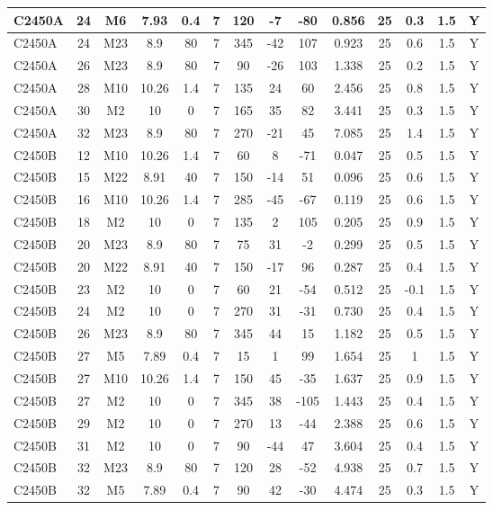 \documentclass{article}
\begin{document}
\begin{center}
\begin{longtable}{|l|c|c|c|c|c|c|c|c|c|c|c|c|c|}
C2450A	&	24	&	M6	&	7.93	&	0.4	&	7	&	120	&	-7	&	-80	&	0.856	&	25	&	0.3	&	1.5	&	Y	\\\hline
C2450A	&	24	&	M23	&	8.9	&	80	&	7	&	345	&	-42	&	107	&	0.923	&	25	&	0.6	&	1.5	&	Y	\\\hline
C2450A	&	26	&	M23	&	8.9	&	80	&	7	&	90	&	-26	&	103	&	1.338	&	25	&	0.2	&	1.5	&	Y	\\\hline
C2450A	&	28	&	M10	&	10.26	&	1.4	&	7	&	135	&	24	&	60	&	2.456	&	25	&	0.8	&	1.5	&	Y	\\\hline
C2450A	&	30	&	M2	&	10	&	0	&	7	&	165	&	35	&	82	&	3.441	&	25	&	0.3	&	1.5	&	Y	\\\hline
C2450A	&	32	&	M23	&	8.9	&	80	&	7	&	270	&	-21	&	45	&	7.085	&	25	&	1.4	&	1.5	&	Y	\\\hline
C2450B	&	12	&	M10	&	10.26	&	1.4	&	7	&	60	&	8	&	-71	&	0.047	&	25	&	0.5	&	1.5	&	Y	\\\hline
C2450B	&	15	&	M22	&	8.91	&	40	&	7	&	150	&	-14	&	51	&	0.096	&	25	&	0.6	&	1.5	&	Y	\\\hline
C2450B	&	16	&	M10	&	10.26	&	1.4	&	7	&	285	&	-45	&	-67	&	0.119	&	25	&	0.6	&	1.5	&	Y	\\\hline
C2450B	&	18	&	M2	&	10	&	0	&	7	&	135	&	2	&	105	&	0.205	&	25	&	0.9	&	1.5	&	Y	\\\hline
C2450B	&	20	&	M23	&	8.9	&	80	&	7	&	75	&	31	&	-2	&	0.299	&	25	&	0.5	&	1.5	&	Y	\\\hline
C2450B	&	20	&	M22	&	8.91	&	40	&	7	&	150	&	-17	&	96	&	0.287	&	25	&	0.4	&	1.5	&	Y	\\\hline
C2450B	&	23	&	M2	&	10	&	0	&	7	&	60	&	21	&	-54	&	0.512	&	25	&	-0.1	&	1.5	&	Y	\\\hline
C2450B	&	24	&	M2	&	10	&	0	&	7	&	270	&	31	&	-31	&	0.730	&	25	&	0.4	&	1.5	&	Y	\\\hline
C2450B	&	26	&	M23	&	8.9	&	80	&	7	&	345	&	44	&	15	&	1.182	&	25	&	0.5	&	1.5	&	Y	\\\hline
C2450B	&	27	&	M5	&	7.89	&	0.4	&	7	&	15	&	1	&	99	&	1.654	&	25	&	1	&	1.5	&	Y	\\\hline
C2450B	&	27	&	M10	&	10.26	&	1.4	&	7	&	150	&	45	&	-35	&	1.637	&	25	&	0.9	&	1.5	&	Y	\\\hline
C2450B	&	27	&	M2	&	10	&	0	&	7	&	345	&	38	&	-105	&	1.443	&	25	&	0.4	&	1.5	&	Y	\\\hline
C2450B	&	29	&	M2	&	10	&	0	&	7	&	270	&	13	&	-44	&	2.388	&	25	&	0.6	&	1.5	&	Y	\\\hline
C2450B	&	31	&	M2	&	10	&	0	&	7	&	90	&	-44	&	47	&	3.604	&	25	&	0.4	&	1.5	&	Y	\\\hline
C2450B	&	32	&	M23	&	8.9	&	80	&	7	&	120	&	28	&	-52	&	4.938	&	25	&	0.7	&	1.5	&	Y	\\\hline
C2450B	&	32	&	M5	&	7.89	&	0.4	&	7	&	90	&	42	&	-30	&	4.474	&	25	&	0.3	&	1.5	&	Y	\\\hline
\end{longtable}
\end{center}
\end{document}
